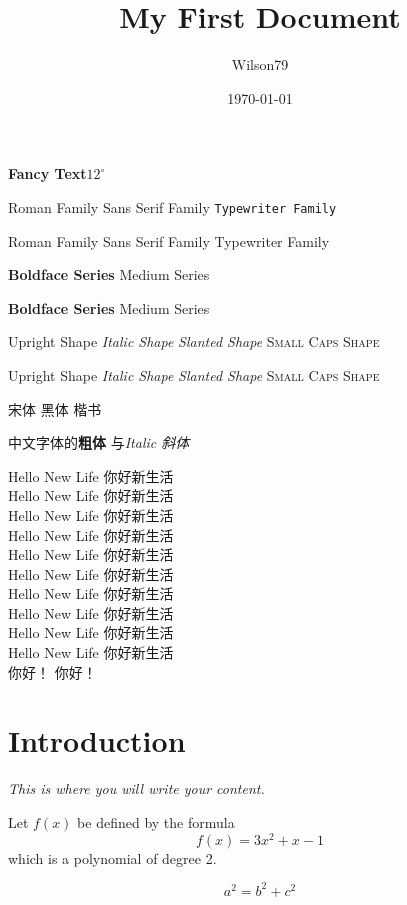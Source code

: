 \documentclass[10pt]{article} %
\title{\rmfamily My First Document}
\author{Wilson79}
\date{\today}
\newcommand{\myfont} {\textbf{\textsf{Fancy Text}}}
\newcommand{\degree} {^\circ}  %
\begin{document}
 
	{\myfont $ 12\degree$}

	\textrm{Roman Family} 
	\textsf{Sans Serif Family}
	\texttt{Typewriter Family}

	\rmfamily Roman Family
	\sffamily Sans Serif Family
	{\ttfamily Typewriter Family}

	\textbf{Boldface Series}
	\textmd{Medium Series}

	{\bfseries Boldface Series}
	{\mdseries Medium Series}

	
	
	\textup{Upright Shape} \textit{Italic Shape}
	\textsl{Slanted Shape} \textsc{Small Caps Shape}

	{\upshape Upright Shape} {\itshape Italic Shape} 
	{\slshape Slanted Shape} {\scshape Small Caps Shape}

	{\songti 宋体} {\heiti 黑体} 
	{\kaishu 楷书}

	中文字体的\textbf{粗体 }与\textit{Italic 斜体} 


	{\tiny Hello New Life 你好新生活} \\
	{\scriptsize Hello New Life 你好新生活} \\
	{\footnotesize Hello New Life 你好新生活} \\
	{\small Hello New Life 你好新生活} \\
	{\normalsize Hello New Life 你好新生活} \\
	{\large Hello New Life 你好新生活} \\
	{\Large Hello New Life 你好新生活} \\
	{\LARGE Hello New Life 你好新生活} \\
	{\huge Hello New Life 你好新生活} \\
	{\Huge Hello New Life 你好新生活} \\

	{ 你好！}
	{ 你好！}




	\section{Introduction} 

	{\ttfamily \itshape This is where you will write your content. }


	\rmfamily Let $f(x)$ be defined by the formula $$f(x)=3x^2+x-1$$ which is a polynomial of degree 2.

	\begin{equation}
	a^2 = b^2+c^2
	\end{equation}
\end{document}
